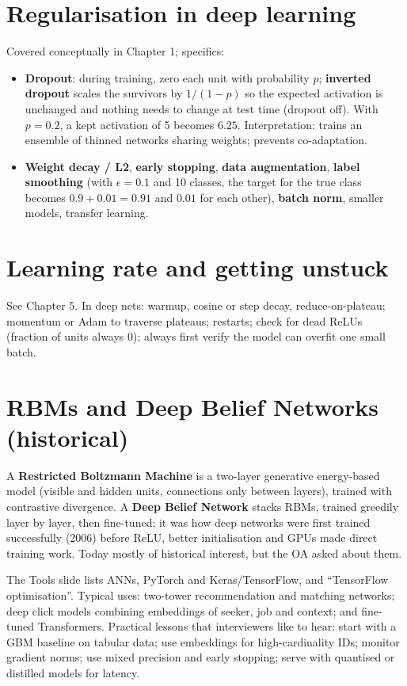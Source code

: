 \section{Regularisation in deep learning}
Covered conceptually in Chapter 1; specifics:
\begin{itemize}
\item \textbf{Dropout}: during training, zero each unit with probability $p$; \textbf{inverted dropout} scales the survivors by $1/(1-p)$ so the expected activation is
  unchanged and nothing needs to change at test time (dropout off). With $p = 0.2$, a kept activation of 5 becomes $6.25$. Interpretation: trains an ensemble of
  thinned networks sharing weights; prevents co-adaptation.
\item \textbf{Weight decay / L2}, \textbf{early stopping}, \textbf{data augmentation}, \textbf{label smoothing} (with $\epsilon = 0.1$ and 10 classes, the target for the
  true class becomes $0.9 + 0.01 = 0.91$ and $0.01$ for each other), \textbf{batch norm}, smaller models, transfer learning.
\end{itemize}

\section{Learning rate and getting unstuck}
See Chapter 5. In deep nets: warmup, cosine or step decay, reduce-on-plateau; momentum or Adam to traverse plateaus; restarts; check for dead ReLUs (fraction of units
always 0); always first verify the model can overfit one small batch.

\section{RBMs and Deep Belief Networks (historical)}
A \textbf{Restricted Boltzmann Machine} is a two-layer generative energy-based model (visible and hidden units, connections only between layers), trained with
contrastive divergence. A \textbf{Deep Belief Network} stacks RBMs, trained greedily layer by layer, then fine-tuned; it was how deep networks were first trained
successfully (2006) before ReLU, better initialisation and GPUs made direct training work. Today mostly of historical interest, but the OA asked about them.

\begin{practical}
The Tools slide lists ANNs, PyTorch and Keras/TensorFlow, and ``TensorFlow optimisation''. Typical uses: two-tower recommendation and matching networks; deep
click models combining embeddings of seeker, job and context; and fine-tuned Transformers. Practical lessons that interviewers like to hear: start with a
GBM baseline on tabular data; use embeddings for high-cardinality IDs; monitor gradient norms; use mixed precision and early stopping; serve with quantised or
distilled models for latency.
\end{practical}


